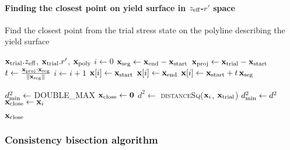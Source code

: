 \paragraph{Finding the closest point on yield surface in $z_{\text{eff}}$-$r'$ space}
\begin{breakablealgorithm}
\caption{Find the closest point from the trial stress state on the polyline describing the yield surface}
\begin{algorithmic}[1]
  \Require $\mathbf{x}_{\text{trial}}.z_{\text{eff}}$, $\mathbf{x}_{\text{trial}}.r'$, $\mathbf{x}_{\text{poly}}$
    \State $i \leftarrow 0$
      \State $\mathbf{x}_{\text{seg}} \leftarrow \mathbf{x}_{\text{end}} - \mathbf{x}_{\text{start}}$
      \State $\mathbf{x}_{\text{proj}} \leftarrow \mathbf{x}_{\text{trial}} - \mathbf{x}_{\text{start}}$
      \State $ t \leftarrow \frac{\mathbf{x}_{\text{proj}} \cdot \mathbf{x}_{\text{seg}}}{\left\lVert\mathbf{x}_{\text{seg}}\right\rVert_{}} $
      \State $i \leftarrow i+1$
        \State $\mathbf{x}[i] \leftarrow \mathbf{x}_{\text{start}}$
        \State $\mathbf{x}[i] \leftarrow \mathbf{x}_{\text{end}}$
      \Else
        \State $\mathbf{x}[i] \leftarrow \mathbf{x}_{\text{start}} + t\,\mathbf{x}_{\text{seg}}$
      \EndIf
    \EndFor

    \State $d^2_{\text{min}} \leftarrow $ DOUBLE\_MAX
    \State $\mathbf{x}_{\text{close}} \leftarrow \boldsymbol{0}$
      \State $d^2 \leftarrow $ \textsc{distanceSq}($\mathbf{x}_i$, $\mathbf{x}_{\text{trial}}$)
        \State $d^2_{\text{min}} \leftarrow d^2$
        \State $\mathbf{x}_{\text{close}} \leftarrow \mathbf{x}_i$
      \EndIf
    \EndFor

    \State \Return $\mathbf{x}_{\text{close}}$
  \EndProcedure
\end{algorithmic}
\end{breakablealgorithm}

\subsubsection{Consistency bisection algorithm}


